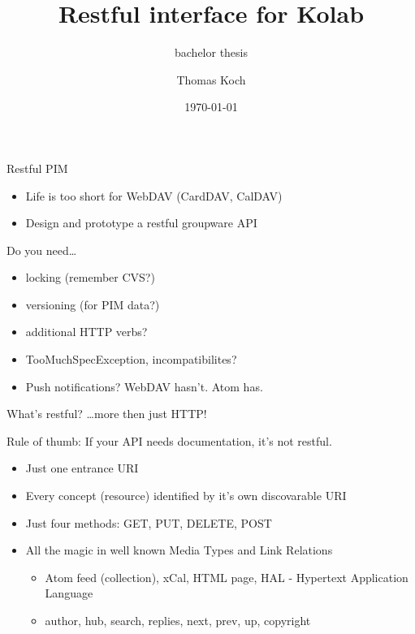 \documentclass{beamer}
\title{Restful interface for Kolab}
\subtitle{bachelor thesis}
\institute{Fernuniversität Hagen}
\date{\today}
\author{Thomas Koch}
\begin{document}
\begin{frame}
  \maketitle{}
\end{frame}


\begin{frame}{Restful PIM}
  \begin{itemize}
  \item Life is too short for WebDAV (CardDAV, CalDAV)
  \item Design and prototype a restful groupware API
  \end{itemize}
\end{frame}

\begin{frame}{Do you need\ldots}
  \begin{itemize}
  \item locking (remember CVS?)
  \item versioning (for PIM data?)
  \item additional HTTP verbs?
  \item TooMuchSpecException, incompatibilites?
  \item Push notifications? WebDAV hasn't. Atom has.
  \end{itemize}
\end{frame}

\begin{frame}{What's restful?}
  \ldots more then just HTTP!

  Rule of thumb: If your API needs documentation, it's not restful.

  \begin{itemize}
  \item Just one entrance URI
  \item Every concept (resource) identified by it's own discovarable URI
  \item Just four methods: GET, PUT, DELETE, POST
  \item All the magic in well known Media Types and Link Relations
    \begin{itemize}
    \item Atom feed (collection), xCal, HTML page, HAL - Hypertext Application Language
    \item author, hub, search, replies, next, prev, up, copyright
    \end{itemize}
  \end{itemize}
\end{frame}
\end{document}
